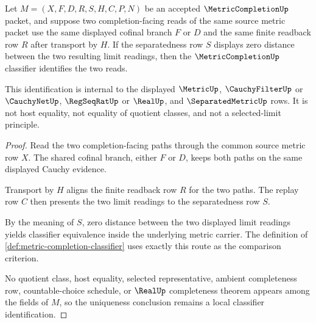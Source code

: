 \begin{theorem}
\label{thm:metric-completion-separated-limit-uniqueness}
Let $M=(X,F,D,R,S,H,C,P,N)$ be an accepted $\MetricCompletionUp$ packet, and suppose two completion-facing reads of the same source metric packet use the same displayed cofinal branch $F$ or $D$ and the same finite readback row $R$ after transport by $H$. If the separatedness row $S$ displays zero distance between the two resulting limit readings, then the $\MetricCompletionUp$ classifier identifies the two reads.

This identification is internal to the displayed $\MetricUp$, $\CauchyFilterUp$ or $\CauchyNetUp$, $\RegSeqRatUp$ or $\RealUp$, and $\SeparatedMetricUp$ rows. It is not host equality, not equality of quotient classes, and not a selected-limit principle.
\end{theorem}
\begin{proof}
Read the two completion-facing paths through the common source metric row $X$. The shared cofinal branch, either $F$ or $D$, keeps both paths on the same displayed Cauchy evidence.

Transport by $H$ aligns the finite readback row $R$ for the two paths. The replay row $C$ then presents the two limit readings to the separatedness row $S$.

By the meaning of $S$, zero distance between the two displayed limit readings yields classifier equivalence inside the underlying metric carrier. The definition of \autoref{def:metric-completion-classifier} uses exactly this route as the comparison criterion.

No quotient class, host equality, selected representative, ambient completeness row, countable-choice schedule, or $\RealUp$ completeness theorem appears among the fields of $M$, so the uniqueness conclusion remains a local classifier identification.
\end{proof}

